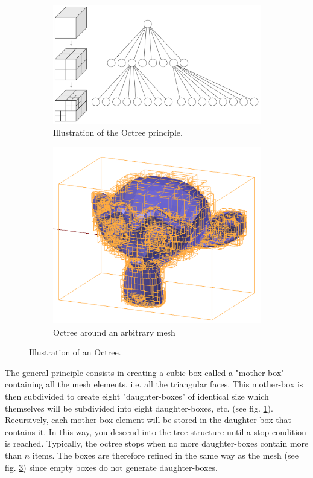 \documentclass[AMA,STIX1COL]{WileyNJD-v2}
\begin{document}
\begin{figure}[h]
\centering
\begin{subfigure}{0.52\textwidth}
	\includegraphics[width=\linewidth]{octree}
	\caption{Illustration of the Octree principle.}
	\label{octree}
	\end{subfigure}
	\begin{subfigure}{0.35\textwidth}
		\includegraphics[width=\linewidth]{octreeSuzanne}
		\caption{Octree around an arbitrary mesh}
		\label{octreeSuzanne}
	\end{subfigure}
	\caption{Illustration of an Octree.}
\end{figure}

The general principle consists in creating a cubic box called a "mother-box" containing all the mesh elements, i.e. all the triangular faces. This mother-box is then subdivided to create eight "daughter-boxes" of identical size which themselves will be subdivided into eight daughter-boxes, etc. (see fig. \ref{octree}). Recursively, each mother-box element will be stored in the daughter-box that contains it. In this way, you descend into the tree structure until a stop condition is reached. Typically, the octree stops when no more daughter-boxes contain more than $n$ items. The boxes are therefore refined in the same way as the mesh (see fig. \ref{octreeSuzanne}) since empty boxes do not generate daughter-boxes.
\end{document}
